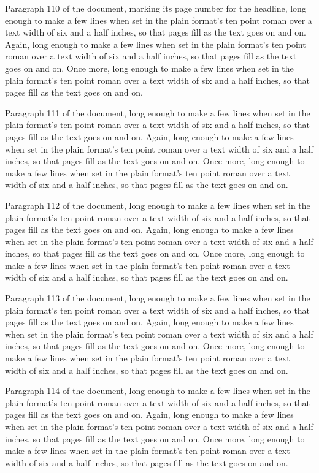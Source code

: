 Paragraph 110 of the document, marking its page number for the headline, long enough to make a few lines when set in the plain format's ten point roman over a text width of six and a half inches, so that pages fill as the text goes on and on. Again, long enough to make a few lines when set in the plain format's ten point roman over a text width of six and a half inches, so that pages fill as the text goes on and on. Once more, long enough to make a few lines when set in the plain format's ten point roman over a text width of six and a half inches, so that pages fill as the text goes on and on.

Paragraph 111 of the document, long enough to make a few lines when set in the plain format's ten point roman over a text width of six and a half inches, so that pages fill as the text goes on and on. Again, long enough to make a few lines when set in the plain format's ten point roman over a text width of six and a half inches, so that pages fill as the text goes on and on. Once more, long enough to make a few lines when set in the plain format's ten point roman over a text width of six and a half inches, so that pages fill as the text goes on and on.

Paragraph 112 of the document, long enough to make a few lines when set in the plain format's ten point roman over a text width of six and a half inches, so that pages fill as the text goes on and on. Again, long enough to make a few lines when set in the plain format's ten point roman over a text width of six and a half inches, so that pages fill as the text goes on and on. Once more, long enough to make a few lines when set in the plain format's ten point roman over a text width of six and a half inches, so that pages fill as the text goes on and on.

Paragraph 113 of the document, long enough to make a few lines when set in the plain format's ten point roman over a text width of six and a half inches, so that pages fill as the text goes on and on. Again, long enough to make a few lines when set in the plain format's ten point roman over a text width of six and a half inches, so that pages fill as the text goes on and on. Once more, long enough to make a few lines when set in the plain format's ten point roman over a text width of six and a half inches, so that pages fill as the text goes on and on.

Paragraph 114 of the document, long enough to make a few lines when set in the plain format's ten point roman over a text width of six and a half inches, so that pages fill as the text goes on and on. Again, long enough to make a few lines when set in the plain format's ten point roman over a text width of six and a half inches, so that pages fill as the text goes on and on. Once more, long enough to make a few lines when set in the plain format's ten point roman over a text width of six and a half inches, so that pages fill as the text goes on and on.

